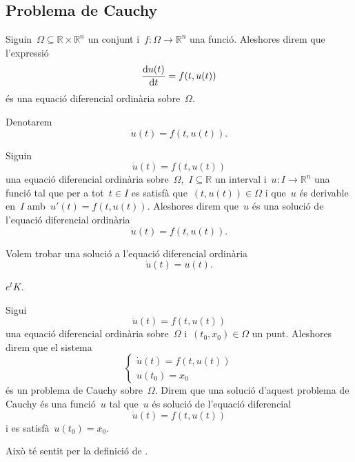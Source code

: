 \documentclass[../../main.tex]{subfiles}
\begin{document}
    \subsection{Problema de Cauchy}
    \begin{definition}
        \label{def:equació diferencial ordinària}
        Siguin~\(\Omega\subseteq\mathbb{R}\times\mathbb{R}^{n}\) un conjunt i~\(f\colon\Omega\longrightarrow\mathbb{R}^{n}\) una funció.
        Aleshores direm que l'expressió
        \[
            \frac{\mathop{}\!\mathrm{d} u(t)}{\mathop{}\!\mathrm{d} t}=f(t,u(t))
        \]
        és una equació diferencial ordinària sobre~\(\Omega\).

        Denotarem
        \[
            \dot{u}(t)=f(t,u(t)).
        \]
    \end{definition}
    \begin{definition}
        \label{def:solució d'una equació diferencial ordinària}
        Siguin
        \[
            \dot{u}(t)=f(t,u(t))
        \]
        una equació diferencial ordinària sobre~\(\Omega\),~\(I\subseteq\mathbb{R}\) un interval i~\(u\colon I\longrightarrow\mathbb{R}^{n}\) una funció tal que per a tot~\(t\in I\) es satisfà que~\((t,u(t))\in\Omega\) i que~\(u\) és derivable en~\(I\) amb~\(u'(t)=f(t,u(t))\).
        Aleshores direm que~\(u\) és una solució de l'equació diferencial ordinària
        \[
            \dot{u}(t)=f(t,u(t)).
        \]
    \end{definition}
    \begin{example}
        \label{ex:exemple d'una equació diferencial 1}
        \label{ex:exemple edos de la exponencial}
        Volem trobar una solució a l'equació diferencial ordinària
        \[
            \dot{u}(t)=u(t).
        \]
        \begin{solution}
            \(e^{t}K\).
        \end{solution}
    \end{example}
    \begin{definition}
        \label{def:problema de Cauchy}
        \label{def:solució d'un problema de Cauchy}
        Sigui
        \[
            \dot{u}(t)=f(t,u(t))
        \]
        una equació diferencial ordinària sobre~\(\Omega\) i~\((t_{0},x_{0})\in\Omega\) un punt.
        Aleshores direm que el sistema
        \[\begin{cases*}
            \displaystyle \dot{u}(t)=f(t,u(t)) \\
            \displaystyle u(t_{0})=x_{0}
        \end{cases*}\]
        és un problema de Cauchy sobre~\(\Omega\).
        Direm que una solució d'aquest problema de Cauchy és una funció~\(u\) tal que~\(u\) és solució de l'equació diferencial
        \[
            \dot{u}(t)=f(t,u(t))
        \]
        i es satisfà~\(u(t_{0})=x_{0}\).

        Això té sentit per la definició de .
    \end{definition}
\end{document}
